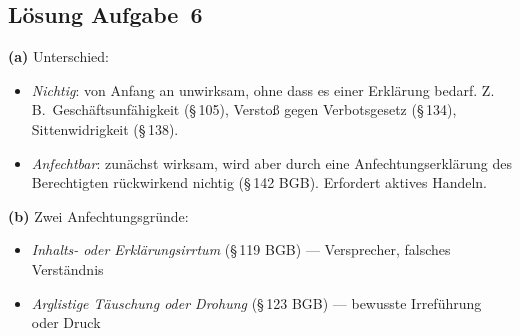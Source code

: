 \documentclass[11pt, a4paper]{article}
\begin{document}
\subsection*{Lösung Aufgabe~6}
\begin{loesung}
\textbf{(a)} Unterschied:
\begin{itemize}[itemsep=0pt]
  \item \emph{Nichtig}: von Anfang an unwirksam, ohne dass es einer Erklärung bedarf. Z.\,B.\ Geschäftsunfähigkeit (§\,105), Verstoß gegen Verbotsgesetz (§\,134), Sittenwidrigkeit (§\,138).
  \item \emph{Anfechtbar}: zunächst wirksam, wird aber durch eine Anfechtungs\-erklärung des Berechtigten rückwirkend nichtig (§\,142 BGB). Erfordert aktives Handeln.
\end{itemize}

\textbf{(b)} Zwei Anfechtungsgründe:
\begin{itemize}[itemsep=0pt]
  \item \emph{Inhalts- oder Erklärungs\-irrtum} (§\,119 BGB) --- Versprecher, falsches Verständnis
  \item \emph{Arglistige Täuschung oder Drohung} (§\,123 BGB) --- bewusste Irreführung oder Druck
\end{itemize}
\end{loesung}
\end{document}

